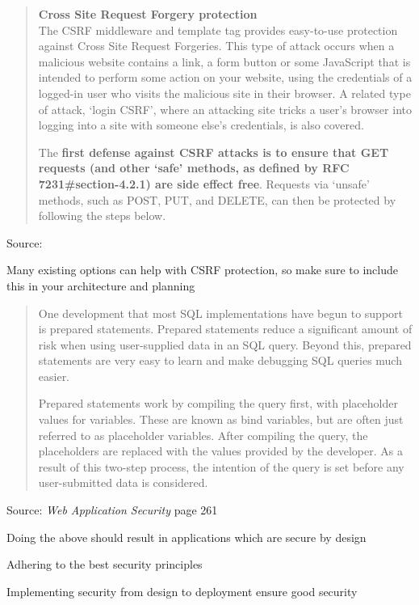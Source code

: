 \documentclass[Screen16to9,17pt]{foils}
\begin{document}
\begin{quote}{\bf
Cross Site Request Forgery protection}\\
The CSRF middleware and template tag provides easy-to-use protection against Cross Site Request Forgeries. This type of attack occurs when a malicious website contains a link, a form button or some JavaScript that is intended to perform some action on your website, using the credentials of a logged-in user who visits the malicious site in their browser. A related type of attack, ‘login CSRF’, where an attacking site tricks a user’s browser into logging into a site with someone else’s credentials, is also covered.

The {\bf first defense against CSRF attacks is to ensure that GET requests (and other ‘safe’ methods, as defined by RFC 7231\#section-4.2.1) are side effect free}. Requests via ‘unsafe’ methods, such as POST, PUT, and DELETE, can then be protected by following the steps below.
\end{quote}
Source: 

\begin{list2}
\item Many existing options can help with CSRF protection, so make sure to include this in your architecture and planning
\end{list2}




\begin{quote}
One development that most SQL implementations have begun to support is prepared statements. Prepared statements reduce a significant amount of risk when using user-supplied data in an SQL query. Beyond this, prepared statements are very easy to learn and make debugging SQL queries much easier.

Prepared statements work by compiling the query first, with placeholder values for variables. These are known as bind variables, but are often just referred to as placeholder variables. After compiling the query, the placeholders are replaced with the values provided by the developer. As a result of this two-step process, the intention of the query is set before any user-submitted data is considered.
\end{quote}
Source: \emph{Web Application Security} page 261

\begin{list2}
\item Doing the above should result in applications which are secure by design
\item Adhering to the best security principles
\item Implementing security from design to deployment ensure good security
\end{list2}
\end{document}
